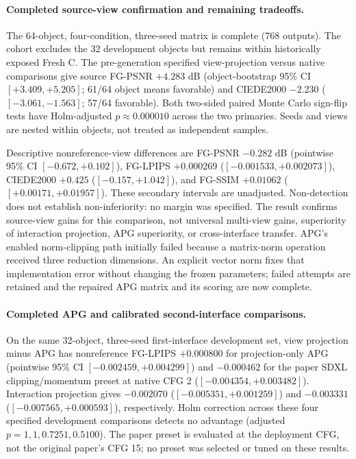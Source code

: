 \documentclass[11pt]{article}
\begin{document}
\paragraph{Completed source-view confirmation and remaining tradeoffs.}
The 64-object, four-condition, three-seed matrix is complete (768 outputs).
The cohort excludes the 32 development objects but remains within historically
exposed Fresh C. The pre-generation specified view-projection versus native
comparisons give source FG-PSNR $+4.283$ dB (object-bootstrap 95\% CI
$[+3.409,+5.205]$; 61/64 object means favorable) and CIEDE2000 $-2.230$
($[-3.061,-1.563]$; 57/64 favorable). Both two-sided paired Monte Carlo
sign-flip tests have Holm-adjusted $p\approx 0.000010$ across the two primaries.
Seeds and views are nested within objects, not treated as independent samples.

Descriptive nonreference-view differences are FG-PSNR $-0.282$ dB
(pointwise 95\% CI $[-0.672,+0.102]$), FG-LPIPS $+0.000269$
($[-0.001533,+0.002073]$), CIEDE2000 $+0.425$
($[-0.157,+1.042]$), and FG-SSIM $+0.01062$
($[+0.00171,+0.01957]$). These secondary intervals are unadjusted.
Non-detection does not establish non-inferiority: no margin was specified.
The result confirms source-view gains for this comparison, not universal
multi-view gains, superiority of interaction projection, APG superiority,
or cross-interface transfer. APG's enabled norm-clipping path initially
failed because a matrix-norm operation received three reduction dimensions.
An explicit vector norm fixes that implementation error without changing the
frozen parameters; failed attempts are retained and the repaired APG matrix
and its scoring are now complete.

\paragraph{Completed APG and calibrated second-interface comparisons.}
On the same 32-object, three-seed first-interface development set, view
projection minus APG has nonreference FG-LPIPS $+0.000800$ for projection-only
APG (pointwise 95\% CI $[-0.002459,+0.004299]$) and $-0.000462$ for the
paper SDXL clipping/momentum preset at native CFG 2
($[-0.004354,+0.003482]$). Interaction projection gives $-0.002070$
($[-0.005351,+0.001259]$) and $-0.003331$
($[-0.007565,+0.000593]$), respectively. Holm correction across these four
specified development comparisons detects no advantage (adjusted
$p=1,1,0.7251,0.5100$). The paper preset is evaluated at the deployment CFG,
not the original paper's CFG 15; no preset was selected or tuned on these results.
\end{document}
